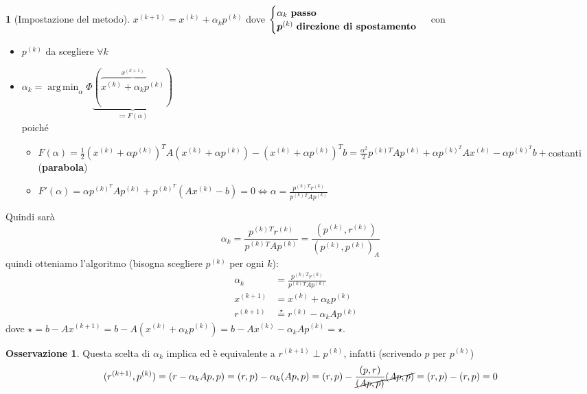 \documentclass[a4paper,10pt]{article}
\theoremstyle{definition}
\DeclareMathOperator*{\argmin}{arg\,min}
\newcommand{\bv}{\boldsymbol} %
\theoremstyle{indentdefinition}
\theoremstyle{indenttheorem}
\theoremstyle{myremark}
\newtheorem*{rem*}{Osservazione}
\theoremstyle{indentgeneral}
\newtheorem{lyxalgorithm}[thm]{\protect\algorithmname}
\theoremstyle{plain}
\theoremstyle{plain}
\begin{document}
\begin{lyxalgorithm}[Impostazione del metodo]
\label{def:metodo-del-gradiente}$x^{\left(k+1\right)}=x^{\left(k\right)}+\alpha_{k}p^{\left(k\right)}$
dove $\begin{cases}
    \alpha_k \text{ \textbf{passo}}\\
    \bv{p}^{(k)} \text{ \textbf{direzione di spostamento}} 
\end{cases}$ con
\begin{itemize}
    \item $p^{\left(k\right)}$ da scegliere $\forall k$
    \item $\alpha_{k} =\argmin_{\alpha}\Phi\underbrace{(\overbrace{x^{\left(k\right)}+\alpha_{k}p^{\left(k\right)}}^{x^{(k+1)}})}_{\coloneqq F(\alpha)}$ \\
    poiché 
    \begin{itemize}
        \item $F(\alpha)=\frac{1}{2}(x^{(k)}+\alpha p^{(k)})^TA(x^{(k)}+\alpha p^{(k)})-(x^{(k)}+\alpha p^{(k)})^Tb=\frac{\alpha^2}{2}p^{(k)T}Ap^{(k)}+\alpha p^{(k)^T}Ax^{(k)}-\alpha p^{(k)^T}b+$costanti (\textbf{parabola})
        \item $F'(\alpha)=\alpha p^{(k)^T}Ap^{(k)}+p^{(k)^T}(Ax^{(k)}-b)=0\iff \alpha=\frac{p^{\left(k\right)}{}^{T}r^{\left(k\right)}}{p^{\left(k\right)}{}^{T}Ap^{\left(k\right)}}$
    \end{itemize}
\end{itemize}
Quindi sarà 
$$\boxed{\alpha_{k}=\frac{p^{\left(k\right)}{}^{T}r^{\left(k\right)}}{p^{\left(k\right)}{}^{T}Ap^{\left(k\right)}}=\frac{(p^{(k)},r^{(k)})}{(p^{(k)},p^{(k)})_A}}$$
quindi otteniamo l'algoritmo (bisogna scegliere $p^{(k)}$ per ogni $k$):
\begin{align*}
    \alpha_{k}&=\frac{p^{\left(k\right)}{}^{T}r^{\left(k\right)}}{p^{\left(k\right)}{}^{T}Ap^{\left(k\right)}} \\
    x^{(k+1)}&=x^{(k)}+\alpha_kp^{(k)} \\
    r^{(k+1)}&\overset{\star}{=}r^{(k)}-\alpha_kAp^{(k)} \quad 
\end{align*}
dove $\star=b-Ax^{(k+1)}=b-A(x^{(k)}+\alpha_kp^{(k)})=b-Ax^{(k)}-\alpha_kAp^{(k)}=\star$.
\end{lyxalgorithm}

\begin{rem*}
    Questa scelta di $\alpha_k$ implica ed è equivalente  a $r^{(k+1)}\perp p^{(k)}$, infatti (scrivendo $p$ per $p^{(k)}$)
\begin{align*}
    (r^{(k+1)},p^{(k)})=(r-\alpha_kAp,p)=(r,p)-\alpha_k(Ap,p)=(r,p)-\frac{(p,r)}{\cancel{(Ap,p)}}\cancel{(Ap,p)}=(r,p)-(r,p)=0
\end{align*}
\end{rem*}
\end{document}
